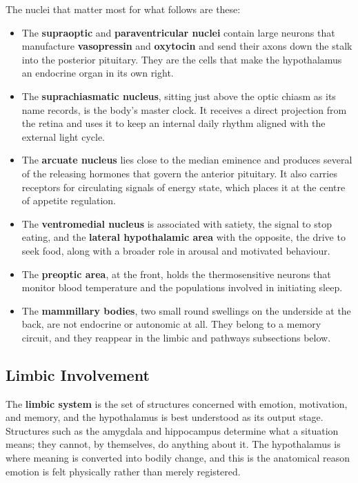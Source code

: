 \documentclass[11pt]{article}
\begin{document}
The nuclei that matter most for what follows are these:

\begin{itemize}
    \item The \textbf{supraoptic} and \textbf{paraventricular nuclei} contain large neurons that manufacture \textbf{vasopressin} and \textbf{oxytocin} and send their axons down the stalk into the posterior pituitary. They are the cells that make the hypothalamus an endocrine organ in its own right.
    \item The \textbf{suprachiasmatic nucleus}, sitting just above the optic chiasm as its name records, is the body's master clock. It receives a direct projection from the retina and uses it to keep an internal daily rhythm aligned with the external light cycle.
    \item The \textbf{arcuate nucleus} lies close to the median eminence and produces several of the releasing hormones that govern the anterior pituitary. It also carries receptors for circulating signals of energy state, which places it at the centre of appetite regulation.
    \item The \textbf{ventromedial nucleus} is associated with satiety, the signal to stop eating, and the \textbf{lateral hypothalamic area} with the opposite, the drive to seek food, along with a broader role in arousal and motivated behaviour.
    \item The \textbf{preoptic area}, at the front, holds the thermosensitive neurons that monitor blood temperature and the populations involved in initiating sleep.
    \item The \textbf{mammillary bodies}, two small round swellings on the underside at the back, are not endocrine or autonomic at all. They belong to a memory circuit, and they reappear in the limbic and pathways subsections below.
\end{itemize}

\subsection{Limbic Involvement}

The \textbf{limbic system} is the set of structures concerned with emotion, motivation, and memory, and the hypothalamus is best understood as its output stage. Structures such as the amygdala and hippocampus determine what a situation means; they cannot, by themselves, do anything about it. The hypothalamus is where meaning is converted into bodily change, and this is the anatomical reason emotion is felt physically rather than merely registered.
\end{document}
